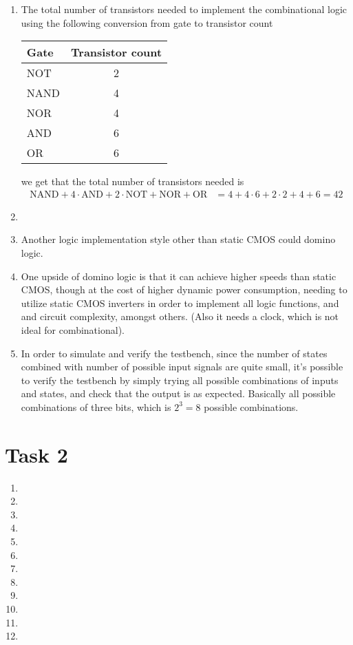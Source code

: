 \documentclass[a4paper,11pt,norsk]{article}
\begin{document}
\begin{enumerate}
    \item The total number of transistors needed to implement the combinational logic using the following conversion from gate to transistor count
        \begin{table}[H]
            \centering
            \begin{tabular}{|l|c|}
                \hline
                \textbf{Gate} & \textbf{Transistor count} \\ \hline
                NOT & 2 \\ \hline
                NAND & 4 \\ \hline
                NOR  & 4 \\ \hline
                AND & 6 \\ \hline
                OR  & 6 \\ \hline
            \end{tabular}
        \end{table}
        we get that the total number of transistors needed is
        \begin{align*}
            \text{NAND} + 4 \cdot \text{AND} + 2 \cdot \text{NOT} + \text{NOR} + \text{OR} &= 4 + 4 \cdot 6 + 2 \cdot 2 + 4 + 6 = 42
        \end{align*}
\item
    \item Another logic implementation style other than static CMOS could domino logic. 
    \item One upside of domino logic is that it can achieve higher speeds than static CMOS, though at the cost of higher dynamic power consumption, 
        needing to utilize static CMOS inverters in order to implement all logic functions, and and circuit complexity, amongst others. (Also it needs a clock,
        which is not ideal for combinational).
    \item In order to simulate and verify the testbench, since the number of states combined with number of possible input signals are quite small,
        it's possible to verify the testbench by simply trying all possible combinations of inputs and states, and check that the output is as expected. 
        Basically all possible combinations of three bits, which is $2^3 = 8$ possible combinations.
\end{enumerate}

\section*{Task 2}
\begin{enumerate}
\item
\item
\item
\item
\item
\item
\item
\item
\item
\item
\item
\item
\end{enumerate}
\end{document}
